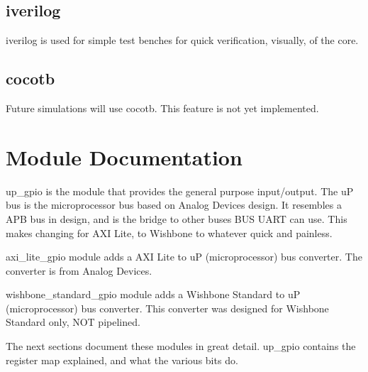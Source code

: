 \subsection{iverilog}
\par
iverilog is used for simple test benches for quick verification, visually, of the core.

\subsection{cocotb}
\par
Future simulations will use cocotb. This feature is not yet implemented.

\newpage

\section{Module Documentation} \label{Module Documentation}

\par
up\_gpio is the module that provides the general purpose input/output.
The uP bus is the microprocessor bus based on Analog Devices design. It resembles a APB bus in design,
and is the bridge to other buses BUS UART can use. This makes changing for AXI Lite, to Wishbone to whatever
quick and painless.

\par
axi\_lite\_gpio module adds a AXI Lite to uP (microprocessor) bus converter. The converter is
from Analog Devices.

\par
wishbone\_standard\_gpio module adds a Wishbone Standard to uP (microprocessor) bus converter. This
converter was designed for Wishbone Standard only, NOT pipelined.

\vspace{15mm}
\par
The next sections document these modules in great detail. up\_gpio contains the register map explained, and what the various bits do.


